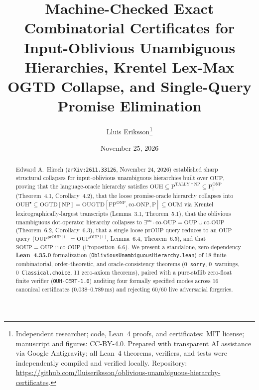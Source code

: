 \documentclass[10pt,twocolumn]{article}
\title{\vspace{-0.8em}\textbf{Machine-Checked Exact Combinatorial Certificates for Input-Oblivious Unambiguous Hierarchies, Krentel Lex-Max OGTD Collapse, and Single-Query Promise Elimination}}
\author{Lluis Eriksson\thanks{Independent researcher; code, Lean~4 proofs, and certificates: MIT license; manuscript and figures: CC-BY-4.0. Prepared with transparent AI assistance via Google Antigravity; all Lean~4 theorems, verifiers, and tests were independently compiled and verified locally. Repository: \url{https://github.com/lluiseriksson/oblivious-unambiguous-hierarchy-certificates}.}}
\date{November 25, 2026}
\newcommand{\OUH}{\mathrm{OUH}}
\newcommand{\OUP}{\mathrm{OUP}}
\newcommand{\ONP}{\mathrm{ONP}}
\newcommand{\SOUP}{\mathrm{SOUP}}
\newcommand{\OGTD}{\mathrm{OGTD}}
\newcommand{\OUGTD}{\mathrm{OUGTD}}
\newcommand{\OUM}{\mathrm{OUM}}
\begin{document}
\maketitle
\vspace{-1.1em}

\begin{abstract}
Edward A.~Hirsch (\texttt{arXiv:2611.33126}, November 24, 2026) established sharp structural collapses for input-oblivious unambiguous hierarchies built over $\OUP$, proving that the language-oracle hierarchy satisfies $\OUH \subseteq \mathrm{P}^{\mathrm{TALLY}\cap\mathrm{NP}} \subseteq \mathrm{P}_{\|}^{\ONP}$ (Theorem~4.1, Corollary~4.2), that the loose promise-oracle hierarchy collapses into $\OUH^\bullet \subseteq \OGTD[\mathrm{NP}] = \OUGTD[\mathrm{FP}^{\ONP},\mathrm{co}\text{-}\ONP,\mathrm{P}] \subseteq \OUM$ via Krentel lexicographically-largest transcripts (Lemma~3.1, Theorem~5.1), that the oblivious unambiguous dot-operator hierarchy collapses to $\exists^{\mathrm{ou}}\!\cdot\mathrm{co}\text{-}\OUP = \OUP \cup \mathrm{co}\text{-}\OUP$ (Theorem~6.2, Corollary~6.3), that a single loose $\mathrm{prOUP}$ query reduces to an $\OUP$ query ($\OUP^{\mathrm{prOUP}[1]} = \OUP^{\OUP[1]}$, Lemma~6.4, Theorem~6.5), and that $\SOUP = \OUP \cap \mathrm{co}\text{-}\OUP$ (Proposition~6.6). We present a standalone, zero-dependency \textbf{Lean~4.35.0} formalization (\texttt{ObliviousUnambiguousHierarchy.lean}) of 18 finite combinatorial, order-theoretic, and oracle-consistency theorems (0~\texttt{sorry}, 0~warnings, 0~\texttt{Classical.choice}, 11 zero-axiom theorems), paired with a pure-stdlib zero-float finite verifier (\texttt{OUH-CERT-1.0}) auditing four formally specified modes across 16 canonical certificates ($0.038$--$0.789\,\mathrm{ms}$) and rejecting 60/60 live adversarial forgeries.
\end{abstract}
\end{document}
